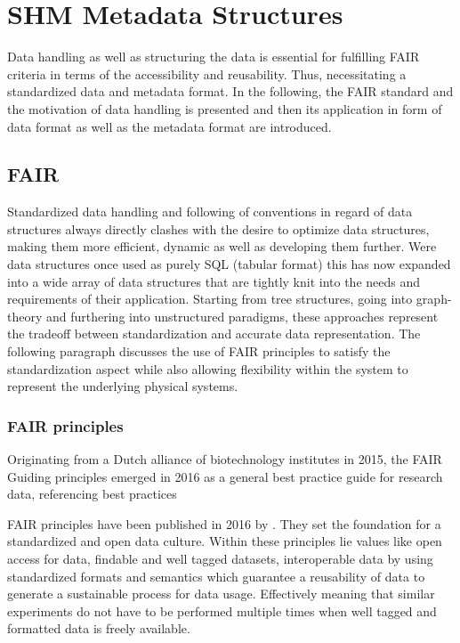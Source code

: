 \newpage


\section{SHM Metadata Structures}

Data handling as well as structuring the data is essential for fulfilling FAIR criteria in terms of the accessibility and reusability. Thus, necessitating a standardized data and metadata format. In the following, the FAIR standard and the motivation of data handling is presented and then its application in form of data format as well as the metadata format are introduced.

\subsection{FAIR}

Standardized data handling and following of conventions in regard of data structures always directly clashes with the desire to optimize data structures, making them more efficient, dynamic as well as developing them further. Were data structures once used as purely SQL (tabular format) this has now expanded into a wide array of data structures that are tightly knit into the needs and requirements of their application. Starting from tree structures, going into graph-theory and furthering into unstructured paradigms, these approaches represent the tradeoff between standardization and accurate data representation. The following paragraph discusses the use of FAIR principles to satisfy the standardization aspect while also allowing flexibility within the system to represent the underlying physical systems.

\subsubsection{FAIR principles}

Originating from a Dutch alliance of biotechnology institutes in 2015, the FAIR Guiding principles emerged in 2016 as a general best practice guide for research data, referencing best practices

FAIR principles have been published in 2016 by \textcite{wilkinson_fair_2016}. They set the foundation for a standardized and open data culture. Within these principles lie values like open access for data, findable and well tagged datasets, interoperable data by using standardized formats and semantics which guarantee a reusability of data to generate a sustainable process for data usage. Effectively meaning that similar experiments do not have to be performed multiple times when well tagged and formatted data is freely available.

